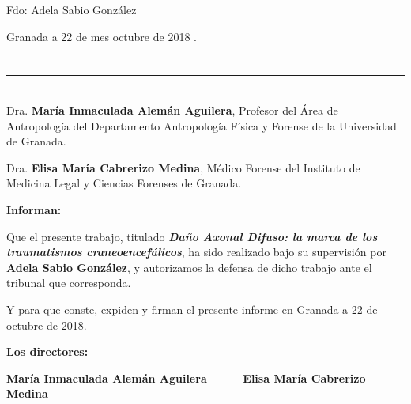 \vspace{6cm}

\noindent Fdo: Adela Sabio González

\vspace{2cm}

\begin{flushright}
Granada a 22 de mes octubre de 2018 .
\end{flushright}


\chapter*{}
\thispagestyle{empty}

\noindent\rule[-1ex]{\textwidth}{2pt}\\[4.5ex]

Dra. \textbf{María Inmaculada Alemán Aguilera}, Profesor del Área de Antropología del Departamento Antropología Física y Forense de la Universidad de Granada.

\vspace{0.5cm}

Dra. \textbf{Elisa María Cabrerizo Medina}, Médico Forense del Instituto de Medicina Legal y Ciencias Forenses de Granada.


\vspace{0.5cm}

\textbf{Informan:}

\vspace{0.5cm}

Que el presente trabajo, titulado \textit{\textbf{Daño Axonal Difuso: la marca de los traumatismos craneoencefálicos}},
ha sido realizado bajo su supervisión por \textbf{Adela Sabio González}, y autorizamos la defensa de dicho trabajo ante el tribunal
que corresponda.

\vspace{0.5cm}

Y para que conste, expiden y firman el presente informe en Granada a 22 de octubre de 2018.

\vspace{1cm}

\textbf{Los directores:}

\vspace{5cm}

\noindent \textbf{María Inmaculada Alemán Aguilera \ \ \ \ \ Elisa María Cabrerizo Medina}


\chapter*{}
\thispagestyle{empty}

